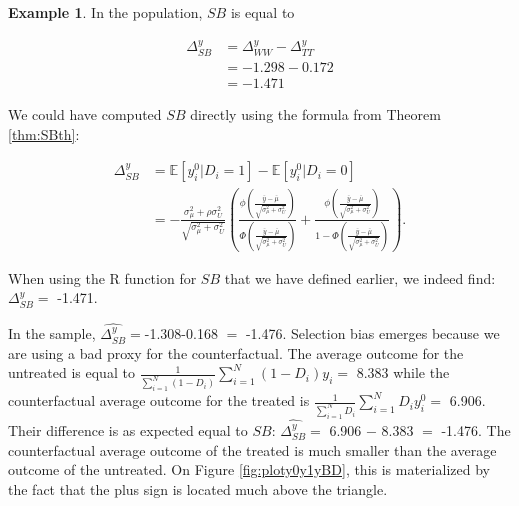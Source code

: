\documentclass[
]{book}
\newcommand{\esp}[1]{\mathbb{E}[ #1 ]}
\theoremstyle{definition}
\theoremstyle{definition}
\newtheorem{example}{Example}[chapter]
\theoremstyle{definition}
\theoremstyle{definition}
\theoremstyle{remark}
\begin{document}
\begin{example}
\protect\hypertarget{exm:unnamed-chunk-17}{}{\label{exm:unnamed-chunk-17} }In the population, \(SB\) is equal to
\end{example}
\begin{align*}
  \Delta^y_{SB} & = \Delta^y_{WW}-\Delta^y_{TT} \\
                & = -1.298 - 0.172 \\
                & = -1.471
\end{align*}

We could have computed \(SB\) directly using the formula from Theorem \ref{thm:SBth}:

\begin{align*}
\Delta^y_{SB} & = \esp{y_i^0|D_i=1}-\esp{y_i^0|D_i=0}\\
              & = -\frac{\sigma^2_{\mu}+\rho\sigma^2_{U}}{\sqrt{\sigma^2_{\mu}+\sigma^2_{U}}}\left(\frac{\phi\left(\frac{\bar{y}-\bar{\mu}}{\sqrt{\sigma^2_{\mu}+\sigma^2_{U}}}\right)}{\Phi\left(\frac{\bar{y}-\bar{\mu}}{\sqrt{\sigma^2_{\mu}+\sigma^2_{U}}}\right)}+\frac{\phi\left(\frac{\bar{y}-\bar{\mu}}{\sqrt{\sigma^2_{\mu}+\sigma^2_{U}}}\right)}{1-\Phi\left(\frac{\bar{y}-\bar{\mu}}{\sqrt{\sigma^2_{\mu}+\sigma^2_{U}}}\right)}\right).
\end{align*}

When using the R function for \(SB\) that we have defined earlier, we indeed find: \(\Delta^y_{SB}=\) -1.471.

In the sample, \(\hat{\Delta^y_{SB}}=\)-1.308-0.168 \(=\) -1.476.
Selection bias emerges because we are using a bad proxy for the counterfactual.
The average outcome for the untreated is equal to \(\frac{1}{\sum_{i=1}^N(1-D_i)}\sum_{i=1}^N(1-D_i)y_i=\) 8.383 while the counterfactual average outcome for the treated is \(\frac{1}{\sum_{i=1}^ND_i}\sum_{i=1}^ND_iy^0_i=\) 6.906.
Their difference is as expected equal to \(SB\):
\(\hat{\Delta^y_{SB}}=\) 6.906 \(-\) 8.383 \(=\) -1.476.
The counterfactual average outcome of the treated is much smaller than the average outcome of the untreated.
On Figure \ref{fig:ploty0y1yBD}, this is materialized by the fact that the plus sign is located much above the triangle.
\end{document}
